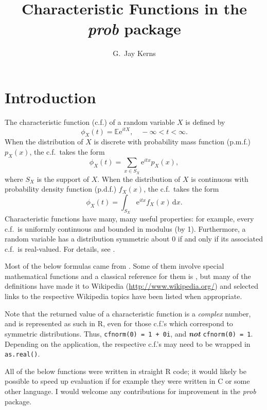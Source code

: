 \documentclass[english]{article}
\newcommand{\Rpackage}[1]{{\textit{#1}}}
\newcommand{\E}{\mathbb{E}}
\newcommand{\me}{\mathrm{e}}
\renewcommand{\d}{\mathrm{d}}
\begin{document}


\title{Characteristic Functions in the \Rpackage{prob} package}


\author{G.~Jay Kerns}

\maketitle
\tableofcontents{}


\pagebreak{}


\section{Introduction}

The characteristic function (c.f.) of a random variable $X$ is defined
by\[
\phi_{X}(t)=\E\me^{itX},\quad-\infty<t<\infty.\]
When the distribution of $X$ is discrete with probability mass function
(p.m.f.) $p_{X}(x)$, the c.f.~takes the form\[
\phi_{X}(t)=\sum_{x\in S_{X}}\me^{itx}p_{X}(x),\]
where $S_{X}$ is the support of $X$. When the distribution of $X$
is continuous with probability density function (p.d.f.) $f_{X}(x)$,
the c.f.~takes the form\[
\phi_{X}(t)=\int_{S_{X}}\me^{itx}f_{X}(x)\,\d x.\]
Characteristic functions have many, many useful properties: for example,
every c.f.~is uniformly continuous and bounded in modulus (by 1).
Furthermore, a random variable has a distribution symmetric about
0 if and only if its associated c.f.~is real-valued. For details,
see \cite{Lukacs}.

Most of the below formulas came from \cite{JKBunivDisc,JKBvol1,JKBvol2}.
Some of them involve special mathematical functions and a classical
reference for them is \cite{AbramStegun}, but many of the definitions
have made it to Wikipedia (\url{http://www.wikipedia.org/}) and selected
links to the respective Wikipedia topics have been listed when appropriate. 

Note that the returned value of a characteristic function is a \emph{complex}
number, and is represented as such in \textsf{R}, even for those c.f.'s
which correspond to symmetric distributions. Thus, \texttt{cfnorm(0)
= 1 + 0i}, and \textbf{\emph{not}} \texttt{cfnorm(0) = 1}. Depending
on the application, the respective c.f.'s may need to be wrapped in
\texttt{as.real()}.

All of the below functions were written in straight \textsf{R} code;
it would likely be possible to speed up evaluation if for example
they were written in \textsf{C} or some other language. I would welcome
any contributions for improvement in the \Rpackage{prob} package.
\end{document}
